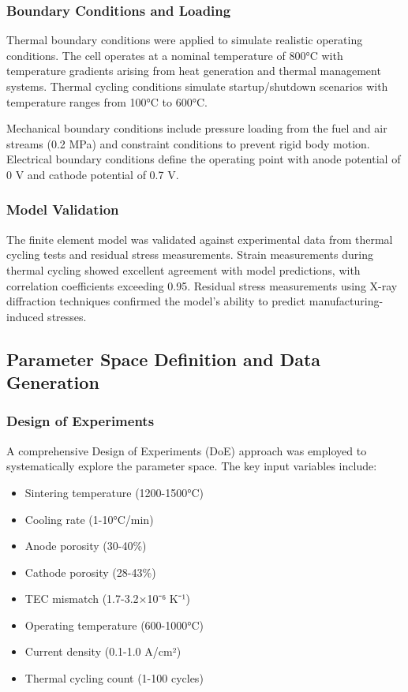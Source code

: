 \documentclass[conference]{IEEEtran}
\begin{document}
\subsubsection{Boundary Conditions and Loading}

Thermal boundary conditions were applied to simulate realistic operating conditions. The cell operates at a nominal temperature of 800°C with temperature gradients arising from heat generation and thermal management systems. Thermal cycling conditions simulate startup/shutdown scenarios with temperature ranges from 100°C to 600°C.

Mechanical boundary conditions include pressure loading from the fuel and air streams (0.2 MPa) and constraint conditions to prevent rigid body motion. Electrical boundary conditions define the operating point with anode potential of 0 V and cathode potential of 0.7 V.

\subsubsection{Model Validation}

The finite element model was validated against experimental data from thermal cycling tests and residual stress measurements. Strain measurements during thermal cycling showed excellent agreement with model predictions, with correlation coefficients exceeding 0.95. Residual stress measurements using X-ray diffraction techniques confirmed the model's ability to predict manufacturing-induced stresses.

\subsection{Parameter Space Definition and Data Generation}

\subsubsection{Design of Experiments}

A comprehensive Design of Experiments (DoE) approach was employed to systematically explore the parameter space. The key input variables include:

\begin{itemize}
\item Sintering temperature (1200-1500°C)
\item Cooling rate (1-10°C/min)
\item Anode porosity (30-40\%)
\item Cathode porosity (28-43\%)
\item TEC mismatch (1.7-3.2×10⁻⁶ K⁻¹)
\item Operating temperature (600-1000°C)
\item Current density (0.1-1.0 A/cm²)
\item Thermal cycling count (1-100 cycles)
\end{itemize}
\end{document}
